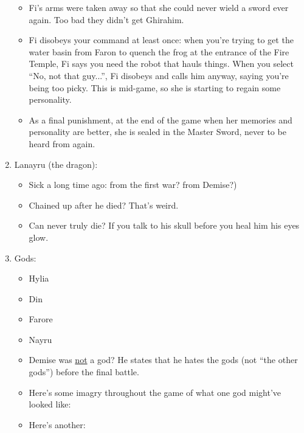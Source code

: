 \begin{enumerate}
{\begin{itemize}
			\item{Fi's arms were taken away so that she could never wield a sword ever again. Too bad they didn't get Ghirahim.}
			\item{Fi disobeys your command at least once: when you're trying to get the water basin from Faron to quench the frog at the entrance of the Fire Temple, Fi says you need the robot that hauls things. When you select ``No, not that guy...'', Fi disobeys and calls him anyway, saying you're being too picky. This is mid-game, so she is starting to regain some personality.}
			\item{As a final punishment, at the end of the game when her memories and personality are better, she is sealed in the Master Sword, never to be heard from again.}
		\end{itemize}
	}
	\item{Lanayru (the dragon):
		\begin{itemize}
			\item{Sick a long time ago: from the first war? from Demise?)}
			\item{Chained up after he died? That's weird.}
			\item{Can never truly die? If you talk to his skull before you heal him his eyes glow.}
		\end{itemize}
		}
		
	\item{Gods:
		\begin{itemize}
			\item{Hylia}
			\item{Din}
			\item{Farore}
			\item{Nayru}
			\item{Demise was \ul{not} a god? He states that he hates the gods (not ``the other gods'') before the final battle.}
			\item{Here's some imagry throughout the game of what one god might've looked like:
				}
			\item{Here's another:
				}
		\end{itemize}
	}
\end{enumerate}


